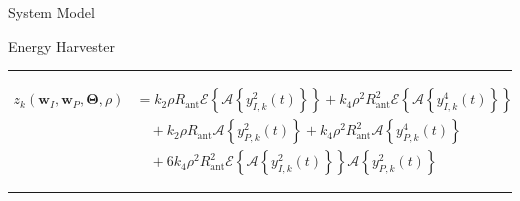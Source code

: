\documentclass{IEEEtran}
\begin{document}
\begin{section} {System Model}
\begin{subsection}	{Energy Harvester}
		\begin{figure*}[b]
			\hrule
			\begin{equation}	\label{eq:z_k_truncated}
				\begin{split}
					z_k(\boldsymbol{w}_I,\boldsymbol{w}_P,\boldsymbol{\Theta},\rho)
					&={k_2}{\rho}{R_{\text{ant}}}\mathcal{E}\left\{\mathcal{A}\left\{y_{I,k}^2(t)\right\}\right\}+{k_4}{\rho^2}{R_{\text{ant}}^2}\mathcal{E}\left\{\mathcal{A}\left\{y_{I,k}^4(t)\right\}\right\}	\\
					&\quad+{k_2}{\rho}{R_{\text{ant}}}\mathcal{A}\left\{y_{P,k}^2(t)\right\}+{k_4}{\rho^2}{R_{\text{ant}}^2}\mathcal{A}\left\{y_{P,k}^4(t)\right\}	\\
					&\quad+6{k_4}{\rho^2}{R_{\text{ant}}^2}\mathcal{E}\left\{\mathcal{A}\left\{y_{I,k}^2(t)\right\}\right\}\mathcal{A}\left\{y_{P,k}^2(t)\right\}
				\end{split}
			\end{equation}
		\end{figure*}
		\begin{figure*}[b]
			\hrule


\end{figure*}
\end{subsection}
\end{section}
\end{document}
